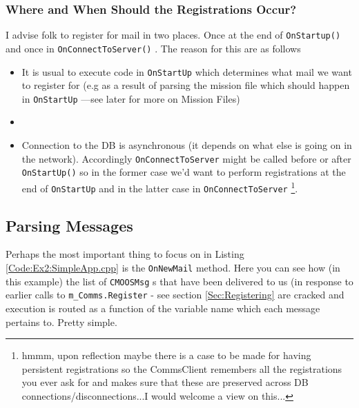 \documentclass[a4paper,10pt]{article}
\newcommand{\Code}[1]{\texttt{#1} }
\newcommand{\code}[1]{\Code{#1} }
\begin{document}
\subsubsection{Where and When Should the Registrations Occur?}

I advise folk to register for mail in two places. Once at the end
of \code{OnStartup()} and once in \code{OnConnectToServer()}. The
reason for this are as follows
\begin{itemize}
\item It is usual to execute code in \code{OnStartUp} which
determines what mail we want to register for (e.g as a result of
parsing the mission file which should happen in
\code{OnStartUp}---see later for more on Mission Files)
\item
\item Connection to the DB is asynchronous (it depends on what
else is going on in the network). Accordingly
\code{OnConnectToServer} might be called before or after
\code{OnStartUp()} so in the former case we'd want to perform
registrations at the end of \code{OnStartUp} and in the latter
case in \code{OnConnectToServer} \footnote{hmmm, upon reflection
maybe there is a case to be made for having persistent
registrations so the CommsClient remembers all the registrations
you ever ask for and makes sure that these are preserved across DB
connections/disconnections...I would welcome a view on this...}.
\end{itemize}


\subsection{Parsing Messages}\label{Sec:MailParsing}

Perhaps the most important thing to focus on in Listing
\ref{Code:Ex2:SimpleApp.cpp} is the \code{OnNewMail} method. Here
you can see how (in this example) the list of \code{CMOOSMsg}s
that have been delivered to us (in response to earlier calls to
\code{m\_Comms.Register} - see section \ref{Sec:Registering} are
cracked and execution is routed as a function of the variable name
which each message pertains to. Pretty simple.
\end{document}
